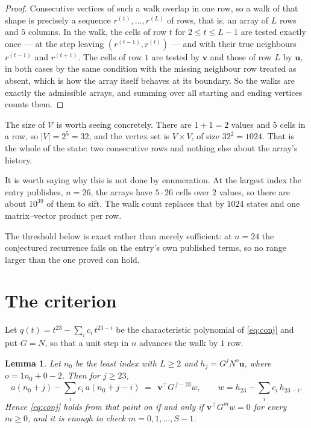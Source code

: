 \documentclass[11pt,a4paper]{article}
\theoremstyle{plain}
\newtheorem{lemma}[theorem]{Lemma}
\theoremstyle{definition}
\begin{document}
\begin{proof}
Consecutive vertices of such a walk overlap in one row, so a walk of that shape is
precisely a sequence $r^{(1)},\dots,r^{(L)}$ of rows, that is, an array of $L$ rows
and $5$ columns. In the walk, the cells of row $t$ for $2\le t\le L-1$ are tested
exactly once --- at the step leaving $(r^{(t-1)},r^{(t)})$ --- and with their true
neighbours $r^{(t-1)}$ and $r^{(t+1)}$. The cells of row $1$ are tested by
$\mathbf{v}$ and those of row $L$ by $\mathbf{u}$, in both cases by the same condition
with the missing neighbour row treated as absent, which is how the array itself behaves at
its boundary. So the walks are exactly the admissible arrays, and summing over all starting
and ending vertices counts them.
\end{proof}


The size of $\mathcal V$ is worth seeing concretely. There are $1+1=2$ values
and $5$ cells in a row, so $|V|=2^{5}=32$, and the vertex set is
$V\times V$, of size $32^2=1024$. That is the whole of the state: two consecutive
rows and nothing else about the array's history.

It is worth saying why this is not done by enumeration. At the largest index the entry
publishes, $n=26$, the arrays have $5\cdot26$ cells over
$2$ values, so there are about $10^{39}$ of them to sift. The
walk count replaces that by $1024$ states and one matrix--vector product per row.

The threshold below is exact rather than merely sufficient: at $n=24$ the conjectured
recurrence fails on the entry's own published terms, so no range larger than the one proved
can hold.
\section{The criterion}

Let $q(t)=t^{23}-\sum_i c_i\,t^{23-i}$ be the characteristic polynomial of
\eqref{eq:conj} and put $G=N$, so that a unit step in $n$ advances the walk by
$1$ row.

\begin{lemma}\label{lem:crit}
Let $n_0$ be the least index with $L\ge2$ and $h_j=G^{j}N^{o}\mathbf{u}$, where
$o=1n_0+0-2$. Then for $j\ge23$,
\[
a(n_0+j)-\sum_i c_i\,a(n_0+j-i)\;=\;\,\mathbf{v}^{\!\top}G^{\,j-23}w,
\qquad w=h_{23}-\sum_i c_i\,h_{23-i} .
\]
Hence \eqref{eq:conj} holds from that point on if and only if
$\mathbf{v}^{\!\top}G^{m}w=0$ for every $m\ge0$, and it is enough to check
$m=0,1,\dots,S-1$.
\end{lemma}
\end{document}
